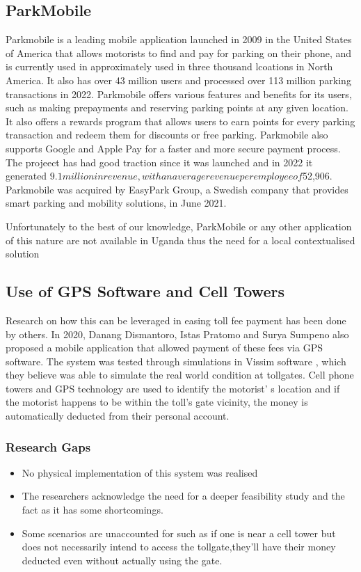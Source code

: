\subsection{ParkMobile}
Parkmobile is a leading mobile application launched in 2009 in the United States of America that allows motorists to find and pay for parking on their phone, and is currently used in approximately used in three thousand lcoations in North America. It also has over 43 million users and processed over 113 million parking transactions in 2022.
Parkmobile offers various features and benefits for its users, such as making prepayments and reserving parking points at any given location. It also offers a rewards program that allows users to earn points for every parking transaction and redeem them for discounts or free parking. Parkmobile also supports Google and Apple Pay for a faster and more secure payment process. \cite{parkmobile_2022}
The projeect has had good traction since it was launched and in 2022 it generated $9.1 million in revenue , with an average revenue per employee of $52,906. Parkmobile was acquired by EasyPark Group, a Swedish company that provides smart parking and mobility solutions, in June 2021.

Unfortunately to the best of our knowledge, ParkMobile or any other application of this nature are not available in Uganda thus the need for a local contextualised solution

\subsection{Use of GPS Software and Cell Towers}
Research on how this can be leveraged in easing toll fee payment has been done by others. In 2020, Danang Dismantoro, Istas Pratomo and Surya Sumpeno also proposed a mobile application that allowed payment of these fees via GPS software\cite{el-rabbany_introduction_2002,dismantoro_minimizing_2020}. The system was tested through simulations in Vissim software \cite{ptv_vissim_traffic_2022}, which they believe was able to simulate the real world condition at tollgates. Cell phone towers and GPS technology are used to identify the motorist’ s location and if the motorist happens to be within the toll’s gate vicinity, the money is automatically deducted from their personal account.

\subsubsection{Research Gaps}
\begin{itemize}
    \item No physical implementation of this system was realised
    \item The researchers acknowledge the need for a deeper feasibility study and the fact as it has some shortcomings.
    \item Some scenarios are unaccounted for such as if one is near a cell tower but does not necessarily intend to access the tollgate,they’ll have their money deducted even without actually using the gate.
\end{itemize}

